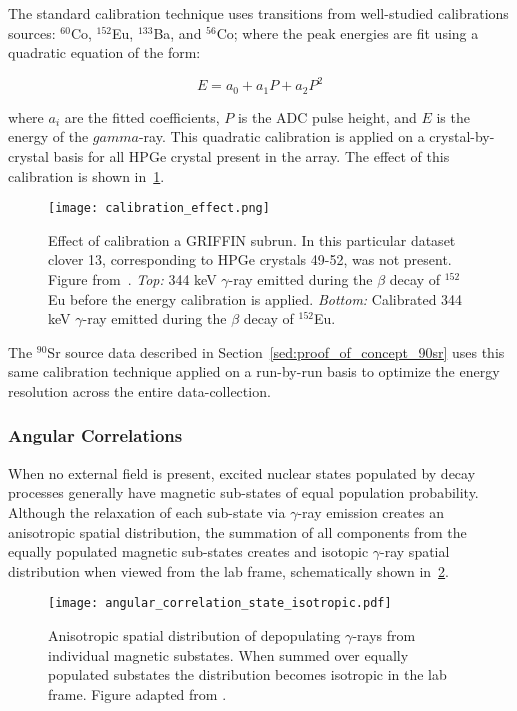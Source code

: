 \documentclass[cnatzke_thesis_proposal.tex]{subfiles}
\begin{document}
The standard calibration technique uses transitions from well-studied calibrations sources: $^{60}$Co, $^{152}$Eu, $^{133}$Ba, and $^{56}$Co; where the peak energies are fit using a quadratic equation of the form: 

\begin{equation}
  E = a_0 + a_1 P + a_2 P^2
\end{equation}

where $a_i$ are the fitted coefficients, $P$ is the ADC pulse height, and $E$ is the energy of the $gamma$-ray. 
This quadratic calibration is applied on a crystal-by-crystal basis for all HPGe crystal present in the array. 
The effect of this calibration is shown in~\ref{fig:calibration_effect}. 

\begin{figure}[htbp]
  \centering
  \texttt{[image: calibration\_effect.png]}
  \caption{Effect of calibration a GRIFFIN subrun. In this particular dataset clover 13, corresponding to HPGe crystals 49-52, was not present. Figure from~\cite{maclean_spectroscopy_2021}.
    \textit{Top:} 344 keV $\gamma$-ray emitted during the $\beta$ decay of $^{152}$Eu before the energy calibration is applied. 
    \textit{Bottom:} Calibrated 344 keV $\gamma$-ray emitted during the $\beta$ decay of $^{152}$Eu. 
  }
  \label{fig:calibration_effect}
\end{figure}

The $^{90}$Sr source data described in Section~\ref{sed:proof_of_concept_90sr} uses this same calibration technique applied on a run-by-run basis to optimize the energy resolution across the entire data-collection.

\subsubsection{Angular Correlations}
When no external field is present, excited nuclear states populated by decay processes generally have magnetic sub-states of equal population probability. 
Although the relaxation of each sub-state via $\gamma$-ray emission creates an anisotropic spatial distribution, the summation of all components from the equally populated magnetic sub-states creates and isotopic $\gamma$-ray spatial distribution when viewed from the lab frame, schematically shown in~\ref{fig:angular_correlation_substate}.

\begin{figure}[htbp]
  \centering
  \texttt{[image: angular\_correlation\_state\_isotropic.pdf]}
  \caption{Anisotropic spatial distribution of depopulating $\gamma$-rays from individual magnetic substates. When summed over equally populated substates the distribution becomes isotropic in the lab frame. Figure adapted from \cite{maclean_spectroscopy_2021}.}
  \label{fig:angular_correlation_substate}
\end{figure}
\end{document}
